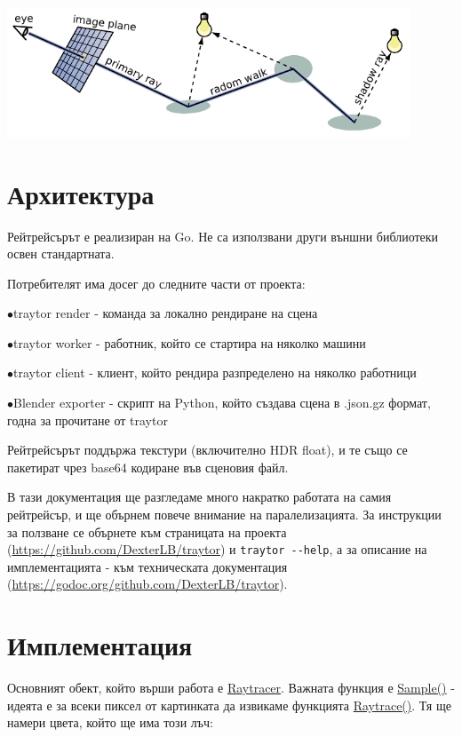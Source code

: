 \documentclass[12pt]{extarticle}
\newlength{\bulletwidth}\settowidth{\bulletwidth}{$\bullet$}
\newcommand{\mitem}{\vspace{5mm}\setlength{\leftskip}{\leftmargin}\hspace*{-\labelsep}\hspace*{-\bulletwidth}$\bullet$\hspace*{\labelsep}}
\newcommand{\mend}{\setlength{\leftskip}{0cm}\vspace{5mm}}
\begin{document}
\vspace{2cm}

\begin{center}
\includegraphics[width=0.9\textwidth]{path_tracing.pdf}
\end{center}

\pagebreak
\section{Архитектура}

Рейтрейсърът е реализиран на Go. Не са използвани други външни
библиотеки освен стандартната.

Потребителят има досег до следните части от проекта:

\mitem traytor render - команда за локално рендиране на сцена

\mitem traytor worker - работник, който се стартира на няколко машини

\mitem traytor client - клиент, който рендира разпределено на няколко
работници

\mitem Blender exporter - скрипт на Python, който създава сцена в
.json.gz формат, годна за прочитане от traytor

\mend

Рейтрейсърът поддържа текстури (включително HDR float), и те също
се пакетират чрез base64 кодиране във сценовия файл.

В тази документация ще разгледаме много накратко работата на самия
рейтрейсър, и ще обърнем повече внимание на паралелизацията. За
инструкции за ползване се обърнете към страницата на проекта 
(\url{https://github.com/DexterLB/traytor})
и \verb|traytor --help|, а за описание на имплементацията - към
техническата документация
(\url{https://godoc.org/github.com/DexterLB/traytor}).

\section{Имплементация}
Основният обект, който върши работа е \href{https://godoc.org/github.com/DexterLB/traytor/raytracer#Raytracer}{Raytracer}. Важната функция е \href{https://godoc.org/github.com/DexterLB/traytor/raytracer#Raytracer.Sample}{Sample()} - идеята е за всеки пиксел
от картинката да извикаме функцията \href{https://godoc.org/github.com/DexterLB/traytor/raytracer#Raytracer.Raytrace}{Raytrace()}.
Тя ще намери цвета, който ще има този лъч:
\end{document}
